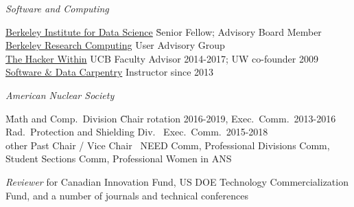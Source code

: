 \vspace*{-.4em}
\textit{Software and Computing}
\vspace*{-.4em}
\begin{tabbing}
\hspace*{1 em}\=\href{http://bids.berkeley.edu/}{Berkeley Institute for Data Science} \hspace*{2.5 em}\= Senior Fellow; Advisory Board Member\\
%
\>\href{http://research-it.berkeley.edu/programs/berkeley-research-computing}{Berkeley Research Computing} \> User Advisory Group\\
%
%
\> \href{http://thehackerwithin.github.io/berkeley/}{The Hacker Within}  \> UCB Faculty Advisor 2014-2017; UW co-founder 2009\\
%
\> \href{http://software-carpentry.org/}{Software \& Data Carpentry}  \> Instructor since 2013%
%
\end{tabbing}
%
\vspace*{-.4em}
\textit{American Nuclear Society}
\vspace*{-.5em}
\begin{tabbing}
\hspace*{1 em}\= Math and Comp.\ Division \hspace*{6em} \= Chair rotation 2016-2019, Exec.\ Comm.\ 2013-2016 \\
%
\> Rad.\ Protection and Shielding Div.\ \> Exec.\ Comm.\ 2015-2018\\
%
%
\> other Past Chair / Vice Chair\ \> NEED Comm, Professional Divisions Comm, \\ \> \> Student Sections Comm, Professional Women in ANS %
%
%
%
%
%
\end{tabbing}

\vspace*{-.4em}

\textit{Reviewer} for Canadian Innovation Fund, US DOE Technology Commercialization Fund, and a number of journals and technical conferences



